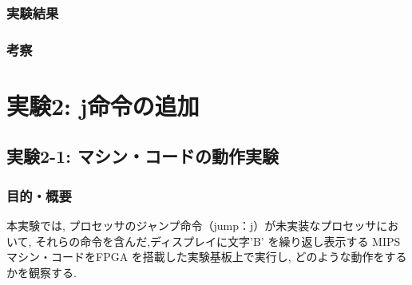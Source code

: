 \documentclass[epsf,a4paper,dvipdfmx,autodetect-engine,titlepage]{jsarticle}
\begin{document}
\subsubsection{実験結果}
\subsubsection{考察}

\section{実験2: j命令の追加}
\subsection{実験2-1: マシン・コードの動作実験}
\subsubsection{目的・概要}
本実験では, プロセッサのジャンプ命令（jump：j）が未実装なプロセッサにおいて, それらの命令を含んだ,ディスプレイに文字’B’ を繰り返し表示する MIPS マシン・コードをFPGA を搭載した実験基板上で実行し, どのような動作をするかを観察する.
\end{document}
